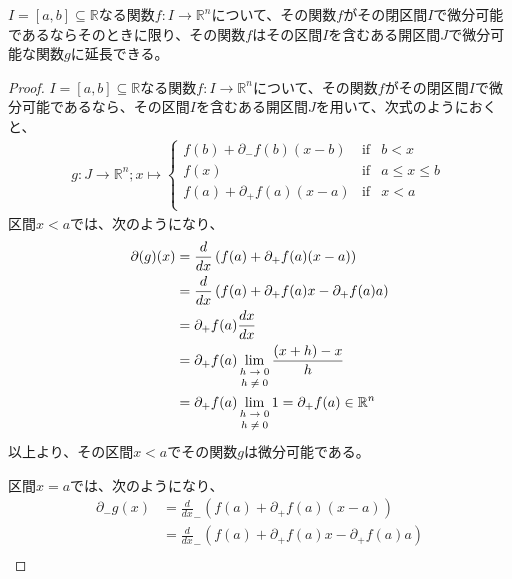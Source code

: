 \documentclass[dvipdfmx]{jsarticle}
\begin{document}
\begin{thm}\label{4.2.1.5}
$I = [ a,b] \subseteq \mathbb{R}$なる関数$f:I \rightarrow \mathbb{R}^{n}$について、その関数$f$がその閉区間$I$で微分可能であるならそのときに限り、その関数$f$はその区間$I$を含むある開区間$J$で微分可能な関数$g$に延長できる。
\end{thm}
\begin{proof}
$I = [ a,b] \subseteq \mathbb{R}$なる関数$f:I \rightarrow \mathbb{R}^{n}$について、その関数$f$がその閉区間$I$で微分可能であるなら、その区間$I$を含むある開区間$J$を用いて、次式のようにおくと、
\begin{align*}
g:J \rightarrow \mathbb{R}^{n};x \mapsto \left\{ \begin{matrix}
f(b) + \partial_{-}f(b)(x - b) & \mathrm{if} & b < x \\
f(x) & \mathrm{if} & a \leq x \leq b \\
f(a) + \partial_{+}f(a)(x - a) & \mathrm{if} & x < a \\
\end{matrix} \right.\ 
\end{align*}
区間$x < a$では、次のようになり、
\begin{align*}
\partial(g)(x) &= \frac{d}{dx}\left( f(a) + \partial_{+}f(a)(x - a) \right)\\
&= \frac{d}{dx}\left( f(a) + \partial_{+}f(a)x - \partial_{+}f(a)a \right)\\
&= \partial_{+}f(a)\frac{dx}{dx}\\
&= \partial_{+}f(a)\lim_{\scriptsize \begin{matrix}
h \rightarrow 0 \\
h \neq 0 \\
\end{matrix}}\frac{(x + h) - x}{h}\\
&= \partial_{+}f(a)\lim_{\scriptsize \begin{matrix}
h \rightarrow 0 \\
h \neq 0 \\
\end{matrix}}1 = \partial_{+}f(a) \in \mathbb{R}^{n}
\end{align*}
以上より、その区間$x < a$でその関数$g$は微分可能である。\par
区間$x = a$では、次のようになり、
\begin{align*}
\partial_{-}g(x) &= \frac{d}{dx}_{-}\left( f(a) + \partial_{+}f(a)(x - a) \right)\\
&= \frac{d}{dx}_{-}\left( f(a) + \partial_{+}f(a)x - \partial_{+}f(a)a \right)\\

\end{align*}
\end{proof}
\end{document}
